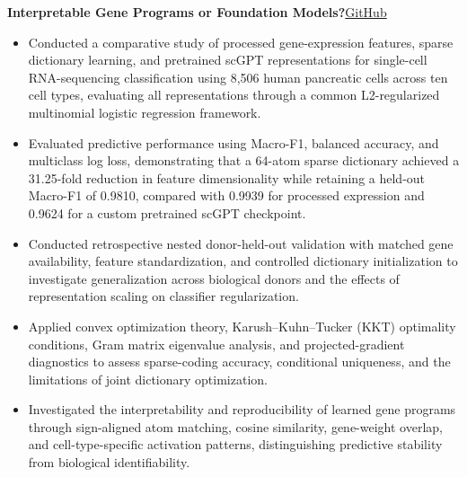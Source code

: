 \documentclass[11pt]{article}
\newcommand{\projectentry}[2]{%
  \Needspace{8\baselineskip}%
  \textbf{#1}\hfill #2\\[-8pt]%
}
\newenvironment{tightitemize}{%
  \vspace{-2pt}%
  \begin{itemize}[leftmargin=*,topsep=0pt,itemsep=1pt,parsep=0pt,partopsep=0pt]
}{%
  \end{itemize}\vspace{4pt}
}
\begin{document}
\projectentry
{Interpretable Gene Programs or Foundation Models?}
{\href{https://github.com/JonathanMa03/gene-complexity}{GitHub}}
\begin{tightitemize}
\item Conducted a comparative study of processed gene-expression features, sparse dictionary learning, and pretrained scGPT representations for single-cell RNA-sequencing classification using 8,506 human pancreatic cells across ten cell types, evaluating all representations through a common L2-regularized multinomial logistic regression framework.
\item Evaluated predictive performance using Macro-F1, balanced accuracy, and multiclass log loss, demonstrating that a 64-atom sparse dictionary achieved a 31.25-fold reduction in feature dimensionality while retaining a held-out Macro-F1 of 0.9810, compared with 0.9939 for processed expression and 0.9624 for a custom pretrained scGPT checkpoint.
\item Conducted retrospective nested donor-held-out validation with matched gene availability, feature standardization, and controlled dictionary initialization to investigate generalization across biological donors and the effects of representation scaling on classifier regularization.
\item Applied convex optimization theory, Karush--Kuhn--Tucker (KKT) optimality conditions, Gram matrix eigenvalue analysis, and projected-gradient diagnostics to assess sparse-coding accuracy, conditional uniqueness, and the limitations of joint dictionary optimization.
\item Investigated the interpretability and reproducibility of learned gene programs through sign-aligned atom matching, cosine similarity, gene-weight overlap, and cell-type-specific activation patterns, distinguishing predictive stability from biological identifiability.
\end{tightitemize}
\end{document}
